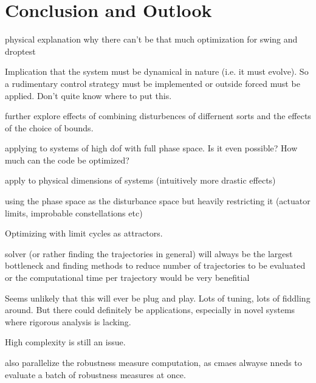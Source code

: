 \chapter{Conclusion and Outlook}


physical explanation why there can't be that much optimization for swing and droptest

Implication that the system must be dynamical in nature (i.e. it must evolve). So a rudimentary control strategy must be implemented or outside forced must be applied. Don't quite know where to put this. 


further explore effects of combining disturbences of differnent sorts and the effects of the choice of bounds.

applying to systems of high dof with full phase space. Is it even possible? How much can the code be optimized?

apply to physical dimensions of systems (intuitively more drastic effects)

using the phase space as the disturbance space but heavily restricting it (actuator limits, improbable constellations etc)

Optimizing with limit cycles as attractors. 

solver (or rather finding the trajectories in general) will always be the largest bottleneck and finding methods to reduce number of trajectories to be evaluated or the computational time per trajectory would be very benefitial


Seems unlikely that this will ever be plug and play. Lots of tuning, lots of fiddling around. But there could definitely be applications, especially in novel systems where rigorous analysis is lacking. 

High complexity is still an issue. 

also parallelize the robustness measure computation, as cmaes alwayse nneds to evaluate a batch of robustness measures at once. 